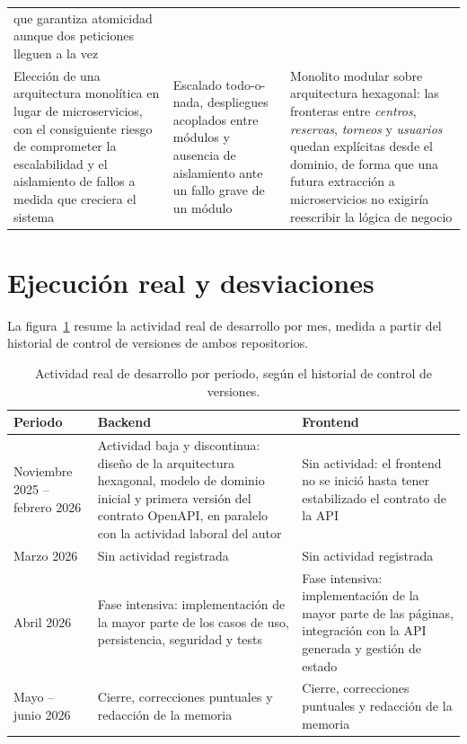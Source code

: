 \begin{longtable}{p{3.4cm}p{3.9cm}p{4.8cm}}
  que garantiza atomicidad aunque dos peticiones lleguen a la vez \\
Elección de una arquitectura monolítica en lugar de microservicios,
  con el consiguiente riesgo de comprometer la escalabilidad y el
  aislamiento de fallos a medida que creciera el sistema &
  Escalado todo-o-nada, despliegues acoplados entre módulos y ausencia de
  aislamiento ante un fallo grave de un módulo &
  Monolito modular sobre arquitectura hexagonal: las fronteras entre
  \textit{centros}, \textit{reservas}, \textit{torneos} y \textit{usuarios}
  quedan explícitas desde el dominio, de forma que una futura extracción a
  microservicios no exigiría reescribir la lógica de negocio \\
\end{longtable}

\section{Ejecución real y desviaciones}
\label{sec:ejecucion_real}

La figura~\ref{tab:ejecucion_real} resume la actividad real de desarrollo por
mes, medida a partir del historial de control de versiones de ambos
repositorios.

\begin{table}[ht]
\centering
\begin{tabularx}{\textwidth}{lXX}
\hline
\textbf{Periodo} & \textbf{Backend} & \textbf{Frontend} \\
\hline
Noviembre 2025 -- febrero 2026 &
  Actividad baja y discontinua: diseño de la arquitectura hexagonal, modelo de
  dominio inicial y primera versión del contrato OpenAPI, en paralelo con
  la actividad laboral del autor &
  Sin actividad: el frontend no se inició hasta tener estabilizado el
  contrato de la API \\
Marzo 2026 &
  Sin actividad registrada &
  Sin actividad registrada \\
Abril 2026 &
  Fase intensiva: implementación de la mayor parte de los casos de uso,
  persistencia, seguridad y tests &
  Fase intensiva: implementación de la mayor parte de las páginas, integración
  con la API generada y gestión de estado \\
Mayo -- junio 2026 &
  Cierre, correcciones puntuales y redacción de la memoria &
  Cierre, correcciones puntuales y redacción de la memoria \\
\hline
\end{tabularx}
\caption{Actividad real de desarrollo por periodo, según el historial de
  control de versiones.}
\label{tab:ejecucion_real}
\end{table}


